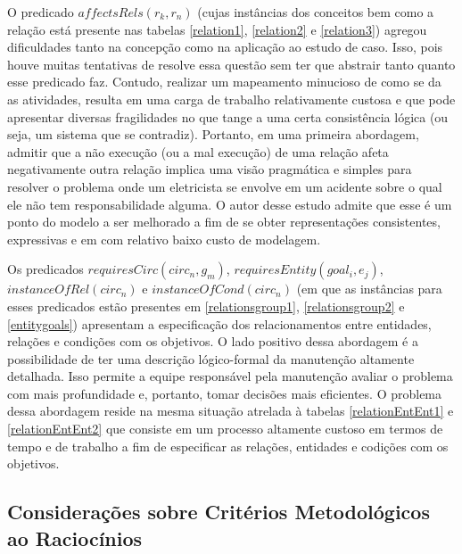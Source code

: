 O predicado $affectsRels(r_k,r_n)$ (cujas instâncias dos conceitos bem como a relação está presente nas tabelas \ref{relation1}, \ref{relation2} e \ref{relation3}) agregou dificuldades tanto na concepção como na aplicação ao estudo de caso. Isso, pois houve muitas tentativas de resolve essa questão sem ter que abstrair tanto quanto esse predicado faz. Contudo, realizar um mapeamento minucioso de como se da as atividades, resulta em uma carga de trabalho relativamente custosa e que pode apresentar diversas fragilidades no que tange a uma certa consistência lógica (ou seja, um sistema que se contradiz). Portanto, em uma primeira abordagem, admitir que a não execução (ou a mal execução) de uma relação afeta negativamente outra relação implica uma visão pragmática e simples para resolver o problema onde um eletricista se envolve em um acidente sobre o qual ele não tem responsabilidade alguma. O autor desse estudo admite que esse é um ponto do modelo a ser melhorado a fim de se obter representações consistentes, expressivas e em com relativo baixo custo de modelagem. 

Os predicados $requiresCirc(circ_n,g_m)$, $requiresEntity(goal_i, e_j)$, $instanceOfRel(circ_n)$ e $instanceOfCond(circ_n)$ (em que as instâncias para esses predicados estão presentes em \ref{relationsgroup1}, \ref{relationsgroup2} e \ref{entitygoals}) apresentam a especificação dos relacionamentos entre entidades, relações e condições com os objetivos. O lado positivo dessa abordagem é a possibilidade de ter uma descrição lógico-formal da manutenção altamente detalhada. Isso permite a equipe responsável pela manutenção avaliar o problema com mais profundidade e, portanto, tomar decisões mais eficientes. O problema dessa abordagem reside na mesma situação atrelada à tabelas \ref{relationEntEnt1} e \ref{relationEntEnt2} que consiste em um processo altamente custoso em termos de tempo e de trabalho a fim de especificar as relações, entidades e codições com os objetivos. 

\subsection{Considerações sobre Critérios Metodológicos ao Raciocínios} \label{conscritmetrac}

